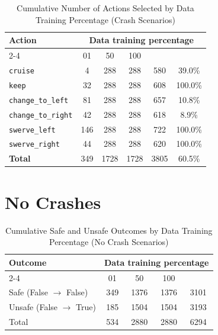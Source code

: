 \documentclass{article}
\begin{document}
\begin{table}[h]
\centering
\caption{Cumulative Number of Actions Selected by Data Training Percentage (Crash Scenarios)}
\begin{tabular}{l|ccc|c|c}
\toprule
\multirow{2}{*}{Action} & \multicolumn{5}{c|}{Data training percentage} & \multirow{2}{*}{Total} & \multirow{2}{*}{Safe (\%)} \\
\cmidrule{2-4}
 & 01 & 50 & 100 & & \\
\midrule
\texttt{cruise} & 4 & 288 & 288 & 580 & 39.0\% \\ 
\texttt{keep} & 32 & 288 & 288 & 608 & 100.0\% \\ 
\texttt{change\_to\_left} & 81 & 288 & 288 & 657 & 10.8\% \\ 
\texttt{change\_to\_right} & 42 & 288 & 288 & 618 & 8.9\% \\ 
\texttt{swerve\_left} & 146 & 288 & 288 & 722 & 100.0\% \\ 
\texttt{swerve\_right} & 44 & 288 & 288 & 620 & 100.0\% \\ 
\midrule
\textbf{Total} & 349 & 1728 & 1728 & 3805 & 60.5\% \\ 
\bottomrule
\end{tabular}
\end{table}

\pagebreak
\section{No Crashes}

\begin{table}[h]
\centering
\caption{Cumulative Safe and Unsafe Outcomes by Data Training Percentage (No Crash Scenarios)}
\begin{tabular}{l|ccc|c}
\toprule
\multirow{2}{*}{Outcome} & \multicolumn{5}{c|}{Data training percentage} & \multirow{2}{*}{Total} \\
\cmidrule{2-4}
 & 01 & 50  & 100 & \\
\midrule
Safe (False $\rightarrow$ False) & 349 & 1376 & 1376 & 3101 \\ 
Unsafe (False $\rightarrow$ True) & 185 & 1504 & 1504 & 3193 \\ 
\midrule
Total & 534 & 2880 & 2880 & 6294 \\ 
\bottomrule
\end{tabular}
\end{table}
\end{document}
